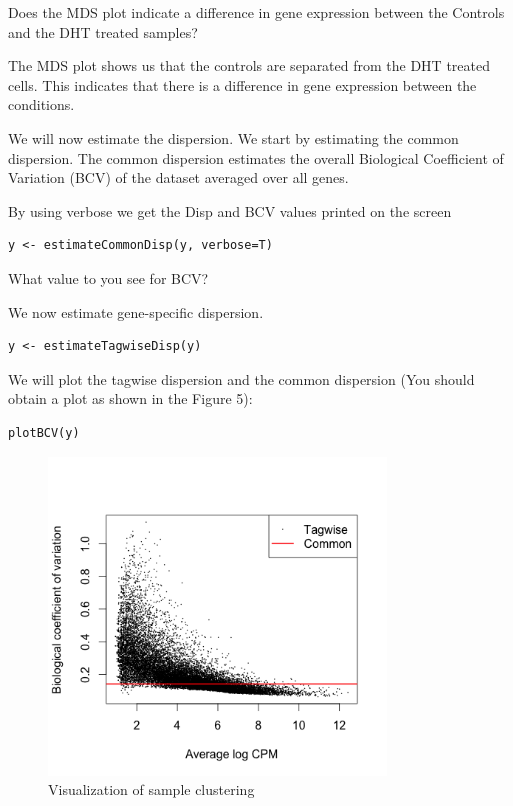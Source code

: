\begin{questions}
Does the MDS plot indicate a difference in gene expression between the Controls and the DHT treated samples?
\begin{answer}
The MDS plot shows us that the controls are separated from the DHT treated cells. This indicates that there is a difference in gene expression between the conditions.	
\end{answer}
\end{questions}
We will now estimate the dispersion. We start by estimating the common dispersion. The common dispersion estimates the overall Biological Coefficient of Variation (BCV) of the dataset averaged over all genes. 

\begin{steps}
By using verbose we get the Disp and BCV values printed on the screen
\begin{lstlisting}
y <- estimateCommonDisp(y, verbose=T)
\end{lstlisting}

\begin{questions}
What value to you see for BCV?
\end{questions}

\begin{steps}
We now estimate gene-specific dispersion.
\begin{lstlisting}
y <- estimateTagwiseDisp(y) 
\end{lstlisting}



We will plot the tagwise dispersion and the common dispersion (You should obtain a plot as shown in the Figure 5):
\begin{lstlisting}
plotBCV(y)
\end{lstlisting}

\end{steps}
\begin{figure}[H]
\centering
\includegraphics[width=0.8\textwidth]{handout/BCV.png}
\caption{Visualization of sample clustering}
\label{fig:BCV plot}
\end{figure}


\end{steps}

